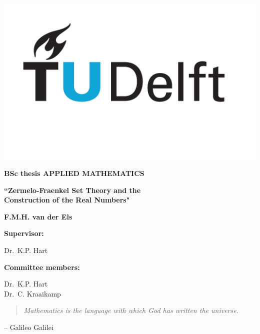 \documentclass[10pt, a4paper]{report}
\theoremstyle{definition}
\begin{document}
\begin{titlepage}
    \null
\end{titlepage}
\newpage

\begin{titlepage}
    \begin{flushright}
        \includegraphics[width=.5\linewidth]{figures/tudelft.png}
    \end{flushright}
    \begin{center}
        {\large\bfseries BSc thesis APPLIED MATHEMATICS}

        \vspace*{3em}

        {\large\bfseries ``Zermelo-Fraenkel Set Theory and the \\ Construction of the Real Numbers"}

        \vspace*{3em}

        {\large\bfseries F.M.H. van der Els}
    \end{center}

    \vspace*{15em}

    \begin{flushleft}
        {\large\bfseries Supervisor:}

        \vspace*{1em}

        {\large Dr.\ K.P. Hart}

        \vspace*{3em}

        {\large\bfseries Committee members:}

        \vspace*{1em}

        {\large Dr.\ K.P. Hart \\[1em] Dr.\ C. Kraaikamp}
    \end{flushleft}
\end{titlepage}
\newpage

\begin{titlepage}
    \begin{quote}
        \textit{Mathematics is the language with which God has written the universe.}
    \end{quote}
    \begin{flushright}
         -- Galileo Galilei
    \end{flushright}
\end{titlepage}
\newpage
\end{document}
